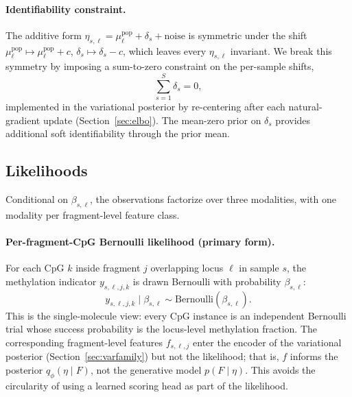 \paragraph{Identifiability constraint.} The additive form $\eta_{s,\ell}=\mu^{\mathrm{pop}}_\ell+\delta_s+\mathrm{noise}$ is symmetric under the shift $\mu^{\mathrm{pop}}_\ell\mapsto\mu^{\mathrm{pop}}_\ell+c$, $\delta_s\mapsto\delta_s-c$, which leaves every $\eta_{s,\ell}$ invariant. We break this symmetry by imposing a sum-to-zero constraint on the per-sample shifts,
\begin{equation}
\sum_{s=1}^{S}\delta_s=0,
\label{eq:sumzero}
\end{equation}
implemented in the variational posterior by re-centering after each natural-gradient update (Section~\ref{sec:elbo}). The mean-zero prior on $\delta_s$ provides additional soft identifiability through the prior mean.

\subsection{Likelihoods}
Conditional on $\beta_{s,\ell}$, the observations factorize over three modalities, with one modality per fragment-level feature class.

\paragraph{Per-fragment-CpG Bernoulli likelihood (primary form).} For each CpG $k$ inside fragment $j$ overlapping locus $\ell$ in sample $s$, the methylation indicator $y_{s,\ell,j,k}$ is drawn Bernoulli with probability $\beta_{s,\ell}$:
\begin{equation}
y_{s,\ell,j,k}\mid \beta_{s,\ell}\sim \mathrm{Bernoulli}(\beta_{s,\ell}).
\label{eq:bern}
\end{equation}
This is the single-molecule view: every CpG instance is an independent Bernoulli trial whose success probability is the locus-level methylation fraction. The corresponding fragment-level features $f_{s,\ell,j}$ enter the encoder of the variational posterior (Section~\ref{sec:varfamily}) but not the likelihood; that is, $f$ informs the posterior $q_\phi(\eta\mid F)$, not the generative model $p(F\mid \eta)$. This avoids the circularity of using a learned scoring head as part of the likelihood.


